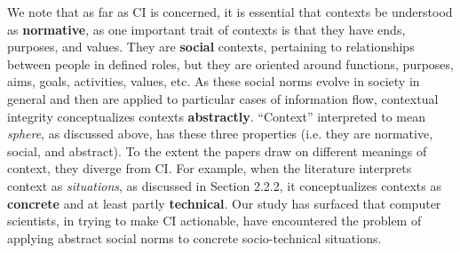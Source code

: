 \documentclass[../thesis.tex]{subfiles}
\begin{document}
\bigskip

We note that as far as CI is concerned, it is essential that contexts be
understood as \textbf{normative}, as one important trait of contexts is
that they have ends, purposes, and values. They are \textbf{social}
contexts, pertaining to relationships between people in defined roles,
but they are oriented around functions, purposes, aims, goals,
activities, values, etc. As these social norms evolve in society in
general and then are applied to particular cases of information flow,
contextual integrity conceptualizes contexts \textbf{abstractly}.
``Context'' interpreted to mean
\textit{sphere}, as discussed above, has these three properties (i.e.
they are normative, social, and abstract). To the extent the papers
draw on different meanings of context, they diverge from CI. For
example, when the literature interprets context as \textit{situations},
as discussed in Section 2.2.2, it conceptualizes contexts as
\textbf{concrete }and at least partly \textbf{technical}. Our study has
surfaced that computer scientists, in trying to make CI actionable,
have encountered the problem of applying abstract social norms to
concrete socio-technical situations.


\bigskip


\bigskip


\bigskip

\clearpage
\bigskip
\end{document}
